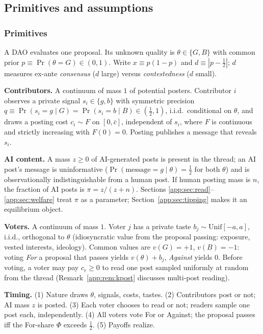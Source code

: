 \documentclass[12pt]{article}
\newcommand{\Pro}{\Pr}
\begin{document}
\subsection{Primitives and assumptions}
\label{app:sec:model}

\subsubsection{Primitives}

A DAO evaluates one proposal. Its unknown quality is $\theta\in\{G,B\}$ with
common prior $p\equiv\Pro(\theta=G)\in(0,1)$. Write $x\equiv p(1-p)$ and
$d\equiv|p-\tfrac12|$; $d$ measures ex-ante \emph{consensus} ($d$ large) versus
\emph{contestedness} ($d$ small).

\textbf{Contributors.} A continuum of mass $1$ of potential posters. Contributor
$i$ observes a private signal $s_i\in\{g,b\}$ with symmetric precision
$q\equiv\Pro(s_i=g\mid G)=\Pro(s_i=b\mid B)\in(\tfrac12,1)$, i.i.d.\ conditional
on $\theta$, and draws a posting cost $c_i\sim F$ on $[0,\bar c]$, independent of
$s_i$, where $F$ is continuous and strictly increasing with $F(0)=0$. Posting
publishes a message that reveals $s_i$.

\textbf{AI content.} A mass $z\ge 0$ of AI-generated posts is present in the
thread; an AI post's message is uninformative
($\Pro(\text{message}=g\mid\theta)=\tfrac12$ for both $\theta$) and is
observationally indistinguishable from a human post. If human posting mass is
$n$, the fraction of AI posts is $\pi=z/(z+n)$. Sections
\ref{app:sec:read}--\ref{app:sec:welfare} treat $\pi$ as a parameter;
Section~\ref{app:sec:tipping} makes it an equilibrium object.

\textbf{Voters.} A continuum of mass $1$. Voter $j$ has a private taste
$b_j\sim\mathrm{Unif}[-a,a]$, i.i.d., orthogonal to $\theta$ (idiosyncratic
value from the proposal passing: exposure, vested interests, ideology). Common
values are $v(G)=+1$, $v(B)=-1$: voting \emph{For} a proposal that passes yields
$v(\theta)+b_j$, \emph{Against} yields $0$. Before voting, a voter may pay
$c_r\ge 0$ to read one post sampled uniformly at random from the thread
(Remark~\ref{app:rem:kpost} discusses multi-post reading).

\textbf{Timing.} (1) Nature draws $\theta$, signals, costs, tastes. (2)
Contributors post or not; AI mass $z$ is posted. (3) Each voter chooses to read
or not; readers sample one post each, independently. (4) All voters vote For or
Against; the proposal passes iff the For-share $\Phi$ exceeds $\tfrac12$.
(5) Payoffs realize.
\end{document}
